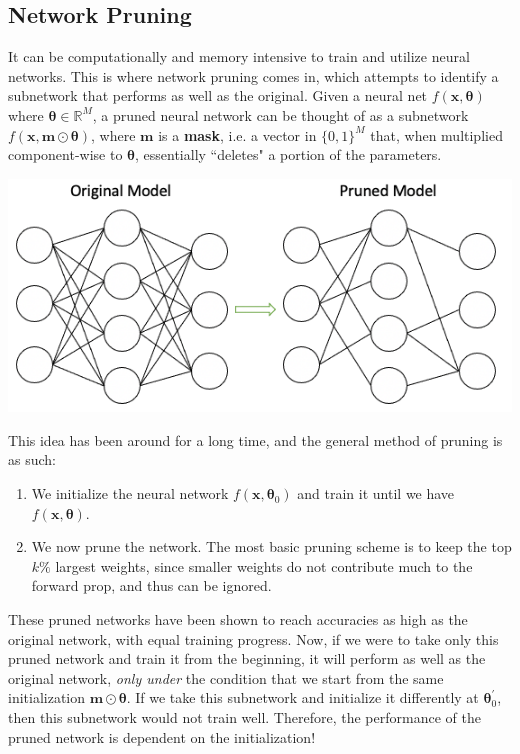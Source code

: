 \subsection{Network Pruning}

  It can be computationally and memory intensive to train and utilize neural networks. This is where network pruning comes in, which attempts to identify a subnetwork that performs as well as the original. Given a neural net $f(\mathbf{x}, \boldsymbol{\theta})$ where $\boldsymbol{\theta} \in \mathbb{R}^M$, a pruned neural network can be thought of as a subnetwork $f(\mathbf{x}, \mathbf{m} \odot \boldsymbol{\theta})$, where $\mathbf{m}$ is a \textbf{mask}, i.e. a vector in $\{0, 1\}^M$ that, when multiplied component-wise to $\boldsymbol{\theta}$, essentially ``deletes" a portion of the parameters. 
  \begin{center}
      \includegraphics[scale=0.4]{img/02_Control/pruned_network.png}
  \end{center}
  This idea has been around for a long time, and the general method of pruning is as such: 
  \begin{enumerate}
      \item We initialize the neural network $f(\mathbf{x}, \boldsymbol{\theta}_0)$ and train it until we have $f(\mathbf{x}, \boldsymbol{\theta})$. 
      \item We now prune the network. The most basic pruning scheme is to keep the top $k\%$ largest weights, since smaller weights do not contribute much to the forward prop, and thus can be ignored. 
  \end{enumerate}
  These pruned networks have been shown to reach accuracies as high as the original network, with equal training progress. Now, if we were to take only this pruned network and train it from the beginning, it will perform as well as the original network, \textit{only under} the condition that we start from the same initialization $\mathbf{m} \odot \boldsymbol{\theta}$. If we take this subnetwork and initialize it differently at $\boldsymbol{\theta}_0^\prime$, then this subnetwork would not train well. Therefore, the performance of the pruned network is dependent on the initialization! 

